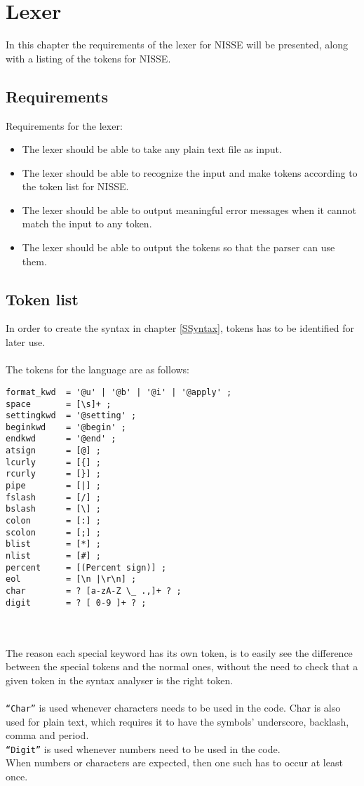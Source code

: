 \chapter{Lexer}
In this chapter the requirements of the lexer for NISSE will be presented, along with a listing of the tokens for NISSE.
\section{Requirements}
Requirements for the lexer:
\begin{itemize}
		\item The lexer should be able to take any plain text file as input.
		\item The lexer should be able to recognize the input and make tokens according to the token list for NISSE.
		\item The lexer should be able to output meaningful error messages when it cannot match the input to any token.
		\item The lexer should be able to output the tokens so that the parser can use them.
\end{itemize}

\newpage
\section{Token list}
In order to create the syntax in chapter \ref{SSyntax}, tokens has to be identified for later use.
\\ \\
The tokens for the language are as follows:

\begin{lstlisting}[frame=single]
format_kwd  = '@u' | '@b' | '@i' | '@apply' ;
space       = [\s]+ ;
settingkwd  = '@setting' ;
beginkwd    = '@begin' ;
endkwd      = '@end' ;
atsign      = [@] ;
lcurly      = [{] ;
rcurly      = [}] ;
pipe        = [|] ;
fslash      = [/] ;
bslash      = [\] ;
colon       = [:] ;
scolon      = [;] ;
blist       = [*] ;
nlist       = [#] ;
percent     = [(Percent sign)] ;
eol         = [\n |\r\n] ;
char        = ? [a-zA-Z \_ .,]+ ? ;
digit       = ? [ 0-9 ]+ ? ;
\end{lstlisting}

\\ \\
The reason each special keyword has its own token, is to easily see the difference between the special tokens and the normal ones, without the need to check that a given token in the syntax analyser is the right token.
\\ \\
\texttt{``Char''} is used whenever characters needs to be used in the code. Char is also used for plain text, which requires it to have the symbols' underscore, backlash, comma and period. \\
\texttt{``Digit''} is used whenever numbers need to be used in the code. \\
When numbers or characters are expected, then one such has to occur at least once.